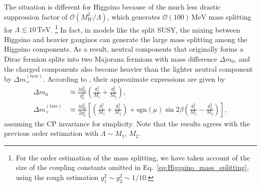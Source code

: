\documentclass[12pt,twoside,book]{article}
\begin{document}
The situation is different for Higgsino because of the much less drastic suppression factor of $\mathcal{O} (M_W^2 / \Lambda)$, which generates $\mathcal{O} (100)\,\mathrm{MeV}$ mass splitting for $\Lambda \lesssim \mathrm{10}\,\mathrm{TeV}$.
\footnote{
  For the order estimation of the mass splitting, we have taken account of the size of the coupling constants omitted in Eq.~\eqref{eq:Higgsino_mass_splitting}, using the rough estimation $g_1^2 \sim g_2^2 \sim 1/10$.
}
In fact, in models like the split SUSY, the mixing between Higgsino and heavier gauginos can generate the large mass splitting among the Higgsino components.
As a result, neutral components that originally forms a Dirac fermion splits into two Majorana fermions with mass difference $\Delta m_0$, and the charged components also become heavier than the lighter neutral component by $\Delta m_{+}^{\mathrm{(tree)}}$.
According to \cite{Fukuda:2017jmk}, their approximate expressions are given by
\begin{align}
  \Delta m_0 &\simeq \frac{M_W^2}{g_2^2} \left( \frac{g_1^2}{M_1} + \frac{g_2^2}{M_2} \right),\\
  \Delta m_{+}^{\mathrm{(tree)}} &\simeq \frac{M_W^2}{2 g_2^2} \left[
  \left( \frac{g_1^2}{M_1} + \frac{g_2^2}{M_2} \right)
  + \mathrm{sgn} (\mu) \sin 2\beta \left( \frac{g_1^2}{M_1} - \frac{g_2^2}{M_2} \right) \right],
  \label{eq:Higgsino_delm_tree}
\end{align}
assuming the CP invariance for simplicity.
Note that the results agrees with the previous order estimation with $\Lambda \sim M_1$, $M_2$.
\end{document}
